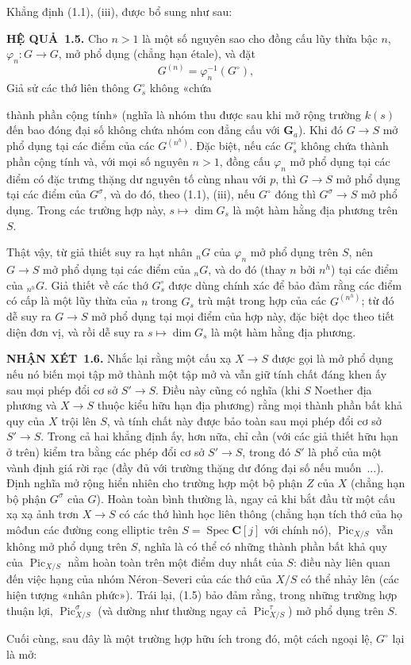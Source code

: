 \documentclass[11pt,twoside,openany]{book}
\numberwithin{equation}{section}
\newcommand{\src}[1]{%
  \phantomsection\hypertarget{src:\fgasourceid:#1}{}%
  \marginpar{\raggedleft\footnotesize\sffamily #1}%
}
\newcommand{\fgasourceid}{unset}
\newcommand{\result}[2]{\par\medskip\noindent\textbf{#1\if\relax\detokenize{#2}\relax\else\ #2\fi.}\quad}
\begin{document}
Khẳng định (1.1), (iii), được bổ sung như sau:

\result{HỆ QUẢ}{1.5} Cho $n>1$ là một số nguyên sao cho đồng cấu lũy thừa bậc
$n$, $\varphi_n:G\longrightarrow G$, mở phổ dụng (chẳng hạn étale), và đặt
\[
G^{(n)}=\varphi_n^{-1}(G^\circ),
\]
Giả sử các thớ liên thông $G_s^\circ$ không «chứa
\src{228}
thành phần cộng tính» (nghĩa là nhóm thu được sau khi mở rộng trường $k(s)$
đến bao đóng đại số không chứa nhóm con đẳng cấu với $\mathbf G_a$). Khi đó
$G\longrightarrow S$ mở phổ dụng tại các điểm của các $G^{(n^h)}$. Đặc biệt,
nếu các $G_s^\circ$ không chứa thành phần cộng tính và, với mọi số nguyên
$n>1$, đồng cấu $\varphi_n$ mở phổ dụng tại các điểm có đặc trưng thặng dư
nguyên tố cùng nhau với $p$, thì $G\longrightarrow S$ mở phổ dụng tại các điểm của $G^\sigma$, và
do đó, theo (1.1), (iii), nếu $G^\circ$ đóng thì
$G^\sigma\longrightarrow S$ mở phổ dụng. Trong các trường hợp này,
$s\longmapsto\dim G_s$ là một hàm hằng địa phương trên $S$.

Thật vậy, từ giả thiết suy ra hạt nhân ${}_nG$ của $\varphi_n$ mở phổ dụng
trên $S$, nên $G\longrightarrow S$ mở phổ dụng tại các điểm của ${}_nG$, và
do đó (thay $n$ bởi $n^h$) tại các điểm của ${}_{n^h}G$. Giả thiết về các thớ
$G_s^\circ$ được dùng chính xác để bảo đảm rằng các điểm có cấp là một lũy
thừa của $n$ trong $G_s$ trù mật trong hợp của các $G^{(n^h)}$; từ đó dễ suy
ra $G\longrightarrow S$ mở phổ dụng tại mọi điểm của hợp này, đặc biệt dọc
theo tiết diện đơn vị, và rồi dễ suy ra $s\longmapsto\dim G_s$ là một hàm
hằng địa phương.

\result{NHẬN XÉT}{1.6} Nhắc lại rằng một cấu xạ $X\longrightarrow S$ được gọi
là mở phổ dụng nếu nó biến mọi tập mở thành một tập mở và vẫn giữ tính chất
đáng khen ấy sau mọi phép đổi cơ sở $S'\longrightarrow S$. Điều này cũng có
nghĩa (khi $S$ Noether địa phương và $X\longrightarrow S$ thuộc kiểu hữu hạn
địa phương) rằng mọi thành phần bất khả quy của $X$ trội lên $S$, và tính chất
này được bảo toàn sau mọi phép đổi cơ sở $S'\longrightarrow S$. Trong cả hai
khẳng định ấy, hơn nữa, chỉ cần (với các giả thiết hữu hạn ở trên) kiểm tra
bằng các phép đổi cơ sở $S'\longrightarrow S$, trong đó $S'$ là phổ của một
vành định giá rời rạc (đầy đủ với trường thặng dư đóng đại số nếu muốn~...).
Định nghĩa mở rộng hiển nhiên cho trường hợp một bộ phận $Z$ của $X$ (chẳng
hạn bộ phận $G^\sigma$ của $G$). Hoàn toàn bình thường là, ngay cả khi bắt đầu
từ một cấu xạ xạ ảnh trơn $X\longrightarrow S$ có các thớ hình học liên thông
(chẳng hạn tích thớ của họ môđun các đường cong elliptic trên
$S=\operatorname{Spec}\mathbf C[j]$ với chính nó),
$\operatorname{Pic}_{X/S}$ vẫn không mở phổ dụng trên $S$, nghĩa là có thể có
những thành phần bất khả quy của $\operatorname{Pic}_{X/S}$ nằm hoàn toàn
trên một điểm duy nhất của $S$: điều này liên quan đến việc hạng của nhóm
Néron--Severi của các thớ của $X/S$ có thể nhảy lên (các hiện tượng «nhân
phức»). Trái lại, (1.5) bảo đảm rằng, trong những trường hợp thuận lợi,
$\operatorname{Pic}_{X/S}^\sigma$ (và dường như thường ngay cả
$\operatorname{Pic}_{X/S}^\tau$) mở phổ dụng trên $S$.
\src{229}
Cuối cùng, sau đây là một trường hợp hữu ích trong đó, một cách ngoại lệ,
$G^\circ$ lại là mở:
\end{document}

